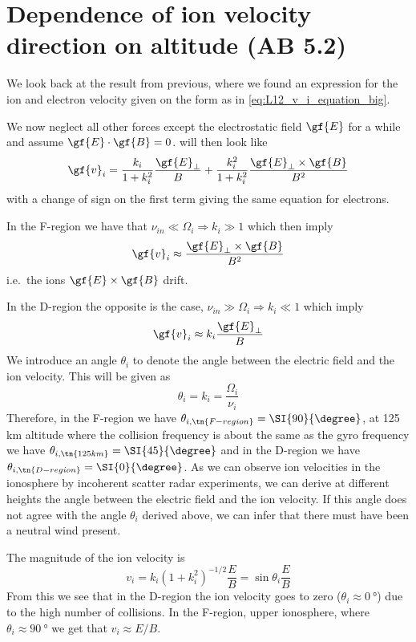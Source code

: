 \section{Dependence of ion velocity direction on altitude (AB 5.2)}
We look back at the result from previous, where we found an expression for the ion and electron velocity given on the form as in \cref{eq:L12_v_i_equation_big}.

We now neglect all other forces except the electrostatic field \(\gf{E}\) for a while and assume \(\gf{E}\cdot\gf{B}=0\).  will then look like
\begin{equation*}
    \gf{v}_i=\frac{k_i}{1+k_i^2}\frac{\gf{E}_\perp}{B}+\frac{k_i^2}{1+k_i^2}\frac{\gf{E}_\perp\times\gf{B}}{B^2}
\end{equation*}
with a change of sign on the first term giving the same equation for electrons.

In the F-region we have that \(\nu_{in}\ll\Omega_i\Rightarrow k_i\gg 1\) which then imply
\begin{equation*}
    \gf{v}_i\approx\frac{\gf{E}_\perp\times\gf{B}}{B^2}
\end{equation*}
i.e.\ the ions \(\gf{E}\times\gf{B}\) drift.

In the D-region the opposite is the case, \(\nu_{in}\gg\Omega_i\Rightarrow k_i\ll 1\) which imply
\begin{equation*}
    \gf{v}_i\approx k_i\frac{\gf{E}_\perp}{B}
\end{equation*}
We introduce an angle \(\theta_i\) to denote the angle between the electric field and the ion velocity. This will be given as
\begin{equation*}
    \theta_i=k_i=\frac{\Omega_i}{\nu_i}
\end{equation*}
Therefore, in the F-region we have \(\theta_{i,\tn{F-region}}=\SI{90}{\degree}\), at 125 km altitude where the collision frequency is about the same as the gyro frequency we have \(\theta_{i,\tn{125 km}}=\SI{45}{\degree}\) and in the D-region we have \(\theta_{i,\tn{D-region}}=\SI{0}{\degree}\). As we can observe ion velocities in the ionosphere by incoherent scatter radar experiments, we can derive at different heights the angle between the electric field and the ion velocity. If this angle does not agree with the angle \(\theta_i\) derived above, we can infer that there must have been a neutral wind present.

The magnitude of the ion velocity is
\begin{equation*}
    v_i=k_i{\left(1+k_i^2\right)}^{-1/2}\frac{E}{B}=\sin\theta_i\frac{E}{B}
\end{equation*}
From this we see that in the D-region the ion velocity goes to zero (\(\theta_i\approx\SI{0}{\degree}\)) due to the high number of collisions. In the F-region, upper ionosphere, where \(\theta_i\approx\SI{90}{\degree}\) we get that \(v_i\approx E/B\).

